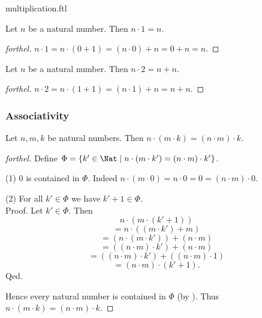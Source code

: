 \documentclass{naproche-library}
\begin{document}
\begin{smodule}{multiplication.ftl}
  \begin{proposition}[forthel,id=ARITHMETIC_06_2910559821365248,printid]
    Let $n$ be a natural number.
    Then $n \cdot 1 = n$.
  \end{proposition}
  \begin{proof}[forthel]
    $n \cdot 1
      = n \cdot (0 + 1)
      = (n \cdot 0) + n
      = 0 + n
      = n$.
  \end{proof}

  \begin{corollary}[forthel,id=ARITHMETIC_06_5679541582299136,printid]
    Let $n$ be a natural number.
    Then $n \cdot 2 = n + n$.
  \end{corollary}
  \begin{proof}[forthel]
    $n \cdot 2
      = n \cdot (1 + 1)
      = (n \cdot 1) + n
      = n + n$.
  \end{proof}


  \subsubsection*{Associativity}

  \begin{proposition}[forthel,id=ARITHMETIC_06_347295585402880,printid]
    Let $n, m, k$ be natural numbers.
    Then $n \cdot (m \cdot k) = (n \cdot m) \cdot k$.
  \end{proposition}
  \begin{proof}[forthel]
    Define $\Phi = \{ k' \in \Nat \mid n \cdot (m \cdot k') = (n \cdot m) \cdot k' \}$.

    (1) $0$ is contained in $\Phi$.
    Indeed $n \cdot (m \cdot 0)
      = n \cdot 0
      = 0
      = (n \cdot m) \cdot 0$.

    (2) For all $k' \in \Phi$ we have $k' + 1 \in \Phi$. \\
    Proof.
      Let $k' \in \Phi$.
      Then
      \[  n \cdot (m \cdot (k' + 1))                          \]
      \[    = n \cdot ((m \cdot k') + m)                      \]
      \[    = (n \cdot (m \cdot k')) + (n \cdot m)            \]
      \[    = ((n \cdot m) \cdot k') + (n \cdot m)            \]
      \[    = ((n \cdot m) \cdot k') + ((n \cdot m) \cdot 1)  \]
      \[    = (n \cdot m) \cdot (k' + 1).                     \]
    Qed.

    Hence every natural number is contained in $\Phi$ (by ).
    Thus $n \cdot (m \cdot k) = (n \cdot m) \cdot k$.
  \end{proof}



\end{smodule}
\end{document}
